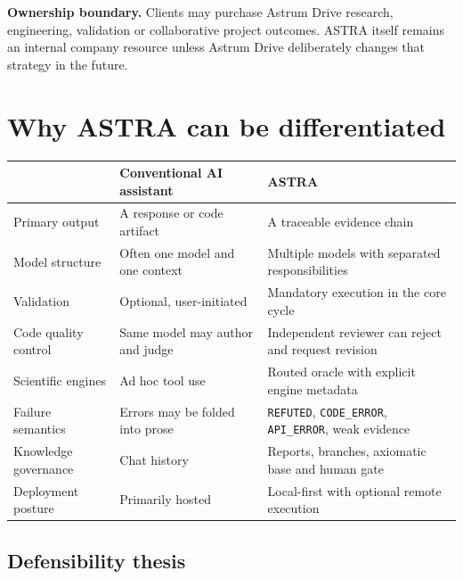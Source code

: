 \documentclass[10pt,a4paper]{article}
\begin{document}
\begin{plainbox}
\textbf{Ownership boundary.} Clients may purchase Astrum Drive research, engineering,
validation or collaborative project outcomes. ASTRA itself remains an internal company
resource unless Astrum Drive deliberately changes that strategy in the future.
\end{plainbox}

\section*{Why ASTRA can be differentiated}

\begin{tabularx}{\textwidth}{@{}p{3.7cm} Y Y@{}}
\toprule
 & Conventional AI assistant & ASTRA \\
\midrule
Primary output & A response or code artifact & A traceable evidence chain \\
Model structure & Often one model and one context & Multiple models with separated responsibilities \\
Validation & Optional, user-initiated & Mandatory execution in the core cycle \\
Code quality control & Same model may author and judge & Independent reviewer can reject and request revision \\
Scientific engines & Ad hoc tool use & Routed oracle with explicit engine metadata \\
Failure semantics & Errors may be folded into prose & \texttt{REFUTED}, \texttt{CODE\_ERROR}, \texttt{API\_ERROR}, weak evidence \\
Knowledge governance & Chat history & Reports, branches, axiomatic base and human gate \\
Deployment posture & Primarily hosted & Local-first with optional remote execution \\
\bottomrule
\end{tabularx}

\subsection*{Defensibility thesis}
\end{document}
